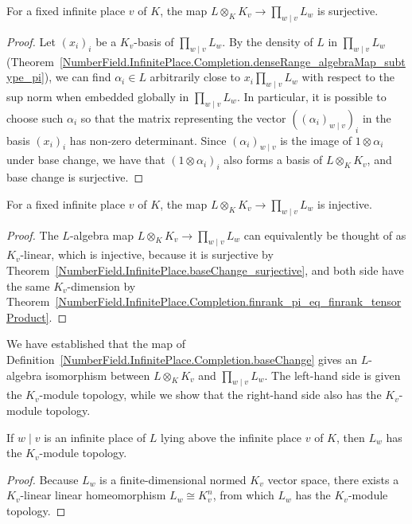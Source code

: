 \begin{theorem}
  \label{NumberField.InfinitePlace.Completion.baseChange_surjective}
  \leanok
  For a fixed infinite place $v$ of $K$, the map $L\otimes_K K_v \to\prod_{w\mid v}L_w$ is
  surjective.
\end{theorem}
\begin{proof}
  Let $(x_i)_i$ be a $K_v$-basis of $\prod_{w\mid v}L_w$. By the density of $L$ in
  $\prod_{w\mid v}L_w$
  (Theorem~\ref{NumberField.InfinitePlace.Completion.denseRange_algebraMap_subtype_pi}), we can
  find $\alpha_i \in L$ arbitrarily close to $x_i\prod_{w\mid v}L_w$ with respect to the sup norm
  when embedded globally in $\prod_{w\mid v}L_w$.
  In particular, it is possible to choose such $\alpha_i$ so that the matrix representing
  the vector $((\alpha_i)_{w \mid v})_i$ in the basis $(x_i)_i$ has non-zero determinant.
  Since $(\alpha_i)_{w \mid v}$ is the image of $1\otimes \alpha_i$ under base change, we have
  that $(1 \otimes \alpha_i)_i$ also forms a basis of $L\otimes_K K_v$, and base change
  is surjective.
\end{proof}

\begin{theorem}
  \label{NumberField.InfinitePlace.Completion.baseChange_injective}
  \leanok
  For a fixed infinite place $v$ of $K$, the map $L\otimes_K K_v \to\prod_{w\mid v}L_w$ is
  injective.
\end{theorem}
\begin{proof}
  The $L$-algebra map $L\otimes_K K_v \to\prod_{w\mid v}L_w$ can equivalently be thought of
  as $K_v$-linear, which is injective, because it is surjective by
  Theorem~\ref{NumberField.InfinitePlace.baseChange_surjective}, and both side have the same
  $K_v$-dimension by
  Theorem~\ref{NumberField.InfinitePlace.Completion.finrank_pi_eq_finrank_tensorProduct}.
\end{proof}

We have established that the map of
Definition~\ref{NumberField.InfinitePlace.Completion.baseChange} gives an $L$-algebra isomorphism
between $L\otimes_K K_v$ and $\prod_{w\mid v}L_w$.
The left-hand side is given the $K_v$-module topology, while we show that the right-hand side also
has the $K_v$-module topology.
\begin{theorem}
  \label{NumberField.InfinitePlace.Completion.instIsModuleTopologyValEqComapAlgebraMap_fLT}
  \leanok
  If $w \mid v$ is an infinite place of $L$ lying above the infinite place $v$ of $K$, then
  $L_w$ has the $K_v$-module topology.
\end{theorem}
\begin{proof}
  Because $L_w$ is a finite-dimensional normed $K_v$ vector space, there exists a $K_v$-linear
  linear homeomorphism $L_w \cong K_v^n$, from which $L_w$ has the $K_v$-module topology.
\end{proof}

